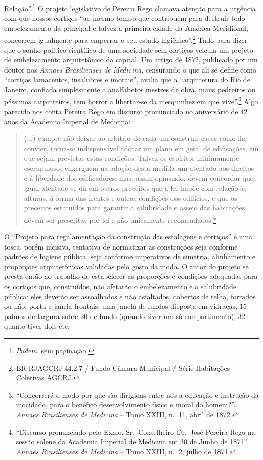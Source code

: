 Relação''.\footnote{\emph{Ibidem}, sem paginação.} O projeto legislativo
de Pereira Rego clamava atenção para a urgência com que nossos cortiços
``ao mesmo tempo que contribuem para destruir todo embelezamento da
principal e talvez a primeira cidade da América Meridional, concorrem
igualmente para emperrar o seu estado higiênico''.\footnote{BR RJAGCRJ
  44.2.7 / Fundo Câmara Municipal / Série Habitações Coletivas AGCRJ.}
Tudo para dizer que o sonho político-científico de uma sociedade sem
cortiços veicula um projeto de embelezamento arquitetônico da capital.
Um artigo de 1872, publicado por um doutor nos \emph{Annaes Brasilienses
de Medicina}, censurando o que ali se define como ``cortiços lamacentos,
insalubres e imorais'', avalia que a ``arquitetura do Rio de Janeiro,
confiada simplesmente a analfabetos mestres de obra, maus pedreiros ou
péssimos carpinteiros, tem horror a libertar-se da mesquinhez em que
vive''.\footnote{``Concorrerá o modo por que são dirigidas entre nós a
  educação e instrução da mocidade, para o benéfico desenvolvimento
  físico e moral do homem?''. \emph{Annaes Brasilienses de Medicina} --
  Tomo XXIII, n.~11, abril de 1872.} Algo parecido nos conta Pereira
Rego em discurso pronunciado no aniversário de 42 anos da Academia
Imperial de Medicina:

\begin{quote}
(...) cumpre não deixar ao arbítrio de cada um construir casas como lhe
convier, torna-se indispensável adotar um plano em geral de edificações,
em que sejam previstas estas condições. Talvez os espíritos minimamente
escrupulosos enxerguem na adoção desta medida um atentado aos direitos e
à liberdade dos edificadores; mas, assim opinando, devem concordar que
igual atentado se dá em outros preceitos que a lei impõe com relação às
alturas, à forma das frentes e outras condições dos edifícios, e que os
preceitos estatuídos para garantir a salubridade e asseio das
habitações, devem ser prescritas por lei e não unicamente
recomendados.\footnote{``Discurso pronunciado pelo Exmo. Sr.~Conselheiro
  Dr.~José Pereira Rego na sessão solene da Academia Imperial de
  Medicina em 30 de Junho de 1871''. \emph{Annaes Brasilienses de
  Medicina} -- Tomo XXIII, n.~2, julho de 1871.}
\end{quote}

O ``Projeto para regulamentação da construção das estalagens e
cortiços'' é uma tosca, porém incisiva, tentativa de normatizar as
construções seja conforme padrões de higiene pública, seja conforme
imperativos de simetria, alinhamento e proporções arquitetônicas
validadas pelo gosto da moda. O autor do projeto se presta então ao
trabalho de estabelecer as proporções e condições adequadas para os
cortiços que, construídos, não afetarão o embelezamento e a salubridade
pública: eles deverão ser assoalhados e não asfaltados, cobertos de
telha, forrados ou não, porta e janela frontais, uma janela de fundos
disposta em vidraças, 15 palmos de largura sobre 20 de fundo (quando
tiver um só compartimento), 32 quanto tiver dois etc.

